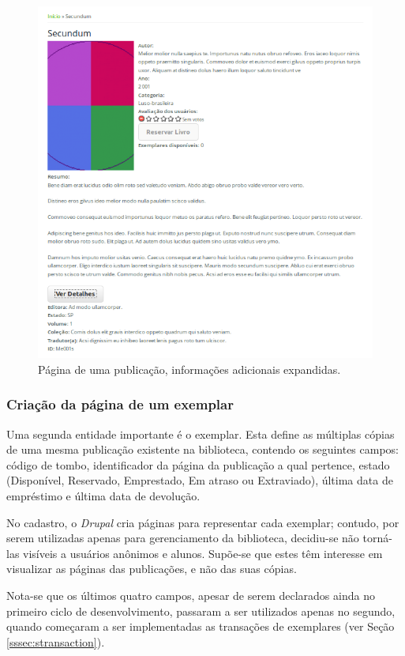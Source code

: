 \documentclass[a4paper]{article}
\begin{document}
\begin{figure}[pbth!]
\centering
\includegraphics[width=140mm]{img/publication-expanded.png}
\caption{Página de uma publicação, informações adicionais expandidas.\label{expanded}}
\end{figure}

\subsubsection{Criação da página de um exemplar}

Uma segunda entidade importante é o exemplar. Esta define as múltiplas cópias de uma mesma publicação existente na biblioteca, contendo os seguintes campos: código de tombo, identificador da página da publicação a qual pertence, estado (Disponível, Reservado, Emprestado, Em atraso ou Extraviado), última data de empréstimo e última data de devolução.

No cadastro, o \textit{Drupal} cria páginas para representar cada exemplar; contudo, por serem utilizadas apenas para gerenciamento da biblioteca, decidiu-se não torná-las visíveis a usuários anônimos e alunos. Supõe-se que estes têm interesse em visualizar as páginas das publicações, e não das suas cópias.

Nota-se que os últimos quatro campos, apesar de serem declarados ainda no primeiro ciclo de desenvolvimento, passaram a ser utilizados apenas no segundo, quando começaram a ser implementadas as transações de exemplares (ver Seção \ref{sssec:stransaction}).
\end{document}
